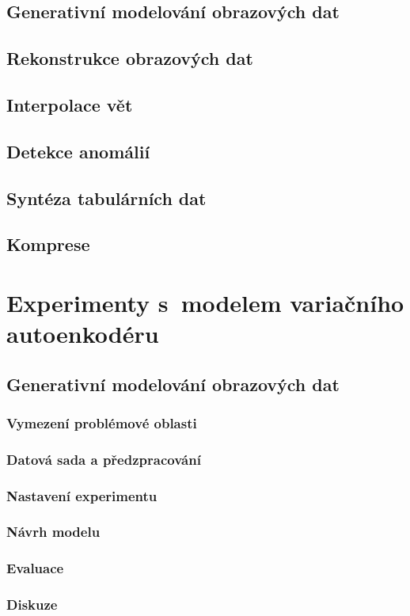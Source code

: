 \documentclass[11pt,a4paper]{report}
\begin{document}
\section{Generativní modelování obrazových dat}
\section{Rekonstrukce obrazových dat}
\section{Interpolace vět}
\section{Detekce anomálií}
\section{Syntéza tabulárních dat}
\section{Komprese}


\chapter{Experimenty s~modelem variačního autoenkodéru}
\section{Generativní modelování obrazových dat}
\subsection{Vymezení problémové oblasti}
\subsection{Datová sada a předzpracování}
\subsection{Nastavení experimentu}
\subsection{Návrh modelu}
\subsection{Evaluace}
\subsection{Diskuze}
\end{document}
